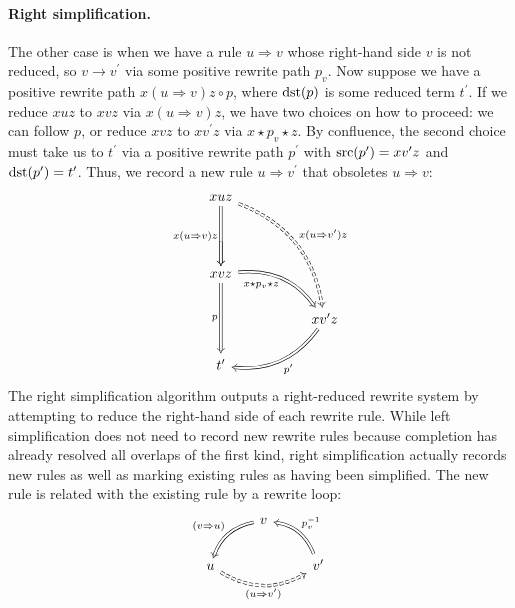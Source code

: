 \documentclass[../generics]{subfiles}
\begin{document}
\paragraph{Right simplification.} The other case is when we have a rule $u\Rightarrow v$ whose right-hand side $v$ is not reduced, so $v\rightarrow v^\prime$ via some positive rewrite path $p_v$. Now suppose we have a positive rewrite path $x(u\Rightarrow v)z\circ p$, where $\operatorname{dst}(p)$ is some reduced term $t^\prime$. If we reduce $xuz$ to $xvz$ via $x(u\Rightarrow v)z$, we have two choices on how to proceed: we can follow $p$, or reduce $xvz$ to $xv^\prime z$ via $x\star p_v \star z$. By confluence, the second choice must take us to $t^\prime$ via a positive rewrite path $p^\prime$ with $\operatorname{src}(p^\prime)=xv^\prime z$ and $\operatorname{dst}(p^\prime)=t^\prime$. Thus, we record a new rule $u\Rightarrow v^\prime$ that obsoletes $u\Rightarrow v$:
\[
\begin{tikzcd}
&xuz\arrow[dd, Rightarrow, "x(u\Rightarrow v)z"']\arrow[rrddd, Rightarrow, bend left, "x(u\Rightarrow v^\prime)z", dashed]&\\
&\arrow[d, Rightarrow]&\\
&xvz\arrow[dd, Rightarrow, "p"']\arrow[rrd, Rightarrow, "x\star p_v\star z"', bend left]\\
&&&xv^\prime z\arrow[lld, "p^\prime", Rightarrow, bend left]\\
&t^\prime&
\end{tikzcd}
\]
The right simplification algorithm outputs a right-reduced rewrite system by attempting to reduce the right-hand side of each rewrite rule. While left simplification does not need to record new rewrite rules because completion has already resolved all overlaps of the first kind, right simplification actually records new rules as well as marking existing rules as having been simplified. The new rule is related with the existing rule by a rewrite loop:
\[
\begin{tikzcd}
&v\arrow[ld, Rightarrow, "(v\Rightarrow u)"', bend right]&\\
u\arrow[rr, Rightarrow, "(u\Rightarrow v^\prime)"', dashed, bend right]&&v^\prime\arrow[lu, Rightarrow, "p_v^{-1}"', bend right]
\end{tikzcd}
\]
\end{document}
